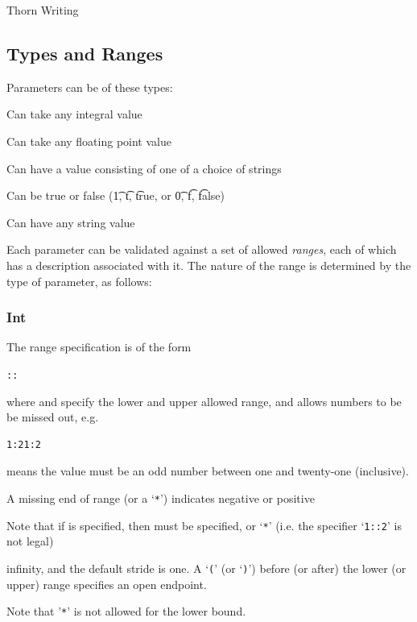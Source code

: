 \begin{cactuspart}{Thorn Writing}
\subsection{Types and Ranges}
\label{sec:Parameters.Types_and_Ranges}

Parameters can be of these types:

\begin{Lentry}
\item[Int]  Can take any integral value
\item[Real] Can take any floating point value
\item[Keyword] Can have a value consisting of one of a choice of strings
\item[Boolean] Can be true or false ({\t 1}, {\t t}, {\t true}, or
{\t 0}, {\t f}, {\t false})
\item[String] Can have any string value
\end{Lentry}

Each parameter can be validated against a set of allowed
\textit{ranges}, each of which has a description associated with it.
The nature
of the range is determined by the type of parameter, as follows:

\subsubsection{Int}

The range specification is of the form

\begin{alltt}
::
\end{alltt}

where  and  specify the lower and upper allowed
range, and  allows numbers to be be missed out, e.g.\
\begin{verbatim}
1:21:2
\end{verbatim}
means the value must be an odd number between one and twenty-one
(inclusive).

A missing end of range (or a `\texttt{*}') indicates negative or positive

Note that if  is specified, then  must be specified, or `\texttt{*}' (i.e.
the specifier `\texttt{1::2}' is not legal)

infinity, and the default stride is one.
A `\texttt{(}' (or `\texttt{)}') before (or after) the lower (or upper) range specifies an open
endpoint.

Note that '\texttt{*}' is not allowed for the lower bound.


\end{cactuspart}
